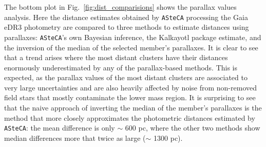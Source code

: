 \documentclass{aa}
\begin{document}
  The bottom plot in Fig.~\ref{fig:dist_comparisions} shows the parallax values
  analysis. Here the distance estimates obtained by \texttt{ASteCA} processing
  the Gaia eDR3 photometry are compared to three methods to estimate distances
  using parallaxes: \texttt{ASteCA}'s own Bayesian inference, the Kalkayotl
  package estimate, and the inversion of the median of the selected member's
  parallaxes. It is clear to see that a trend arises where the most distant
  clusters have their distances enormously underestimated by any of the
  parallax-based methods. This is expected, as the parallax values of the most
  distant clusters are associated to very large uncertainties and are also
  heavily affected by noise from non-removed field stars that mostly contaminate
  the lower mass region.
  It is surprising to see that the naive approach of inverting the median of
  the member's parallaxes is the method that more closely approximates the
  photometric distances estimated by \texttt{ASteCA}: the mean difference is
  only $\sim$ 600 pc, where the other two methods show median differences more
  that twice as large ($\sim$ 1300 pc).
  \\
\end{document}
